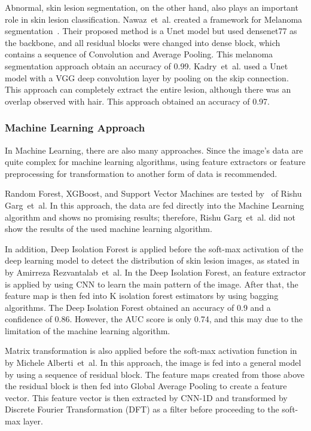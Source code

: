 \documentclass[sensors,article,accept,pdftex,moreauthors]{Definitions/mdpi}
\begin{document}
{		Abnormal, skin lesion segmentation, on the other hand, also plays an important role in skin lesion classification. Nawaz~et~al. created a framework for Melanoma segmentation~\mbox{\cite{22750}}. Their proposed method is a Unet model but used  densenet77 as the  backbone, and all residual blocks were changed into dense block, which contains a sequence of Convolution and  Average Pooling. This melanoma segmentation approach obtain an accuracy of 0.99. Kadry~et~al. used a Unet model with a VGG deep convolution layer by pooling on the skip connection. This approach can completely extract the entire lesion, although there was an overlap observed with hair. This approach obtained an  accuracy of 0.97.
		
		\subsubsection{Machine Learning Approach}
		In Machine Learning, there are also many approaches. Since the image's data are quite complex for machine learning algorithms,  using feature extractors or feature preprocessing for transformation to another form of data is recommended.
		
		Random Forest, XGBoost, and Support Vector Machines are tested by~\mbox{\cite{03798}} of Rishu Garg~et~al. In this approach, the data are fed directly into the Machine Learning algorithm and shows no promising results; therefore, Rishu Garg~et~al. did not show the results of the used machine learning algorithm.
		
		In addition, Deep Isolation Forest is applied before the soft-max activation of the deep learning model to detect the  distribution of skin lesion images, as stated in~\mbox{\cite{09365}} by Amirreza Rezvantalab~et~al. In the Deep Isolation Forest, an feature extractor is applied by using CNN to learn the main pattern of the image. After that, the feature map is then fed into K isolation forest estimators by using bagging algorithms. The Deep Isolation Forest obtained  an accuracy of 0.9 and a confidence of 0.86. However, the AUC score is only 0.74, and this may due to the limitation of the machine learning algorithm. 
		
		Matrix transformation is also applied before the soft-max activation function in~\mbox{\cite{05045}} by Michele Alberti~et~al. In this approach, the image is fed into a general model by using a sequence of residual block. The feature maps created from those above the residual block is then fed into  Global Average Pooling to create a feature vector. This feature vector is then extracted by CNN-1D and transformed by Discrete Fourier Transformation (DFT) as a filter before proceeding to the soft-max layer. 
	}
	
\end{document}
